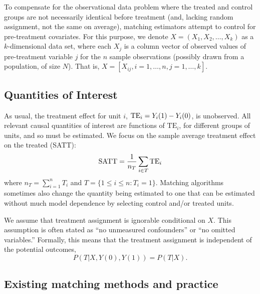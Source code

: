 \documentclass[11pt]{article}
\begin{document}
To compensate for the observational data problem where the treated and
control groups are not necessarily identical before treatment (and,
lacking random assignment, not the same on average), matching
estimators attempt to control for pre-treatment covariates.  For this
purpose, we denote $X=(X_1, X_2, \ldots, X_k)$ as a $k$-dimensional
data set, where each $X_j$ is a column vector of  observed
values of pre-treatment variable $j$ for the $n$ sample observations
(possibly drawn from a population, of size $N$).  That is, $X =
[X_{ij}, i=1, \ldots, n, j=1, \ldots, k]$.

\subsection{Quantities of Interest}

As usual, the treatment effect for unit $i$, ${\rm TE}_i = Y_i(1) -
Y_i(0)$, is unobserved.  All relevant causal quantities of interest
are functions of $\textrm{TE}_i$, for different groups of units, and
so must be estimated.  We focus on the sample average treatment effect
on the treated (SATT):
\begin{equation} 
  {\rm SATT} = \frac{1}{n_T} \sum_{i\in T} {\rm TE}_i
\end{equation}
where $n_T = \sum_{i=1}^n T_i$ and $T = \{1 \leq i \leq n : T_i=1\}$.
Matching algorithms sometimes also change the quantity being estimated
to one that can be estimated without much model dependence by
selecting control and/or treated units.

We assume that treatment assignment is ignorable conditional on $X$. This
assumption is often stated as ``no unmeasured confounders'' or ``no
omitted variables.'' Formally, this means that the treatment assignment is
independent of the potential outcomes, 
\begin{equation}
P(T|X,Y(0),Y(1)) = P(T|X).
\end{equation}

\subsection{Existing matching methods and practice}
\end{document}

